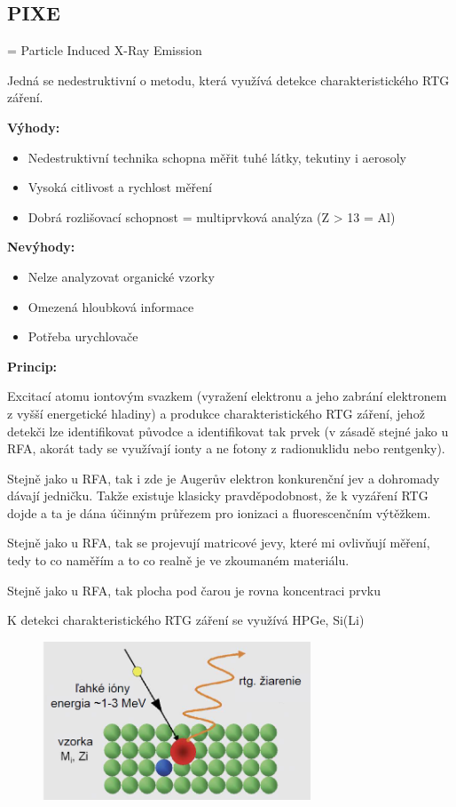\subsection{PIXE}

= Particle Induced X-Ray Emission

Jedná se nedestruktivní o metodu, která využívá detekce charakteristického RTG záření.

\textbf{Výhody:}

\begin{itemize}
    \item Nedestruktivní technika schopna měřit tuhé látky, tekutiny i aerosoly
    \item Vysoká citlivost a rychlost měření
    \item Dobrá rozlišovací schopnost = multiprvková analýza (Z > 13 = Al)
\end{itemize}

\textbf{Nevýhody:}

\begin{itemize}
    \item Nelze analyzovat organické vzorky
    \item Omezená hloubková informace
    \item Potřeba urychlovače
\end{itemize}

\textbf{Princip:}

Excitací atomu iontovým svazkem (vyražení elektronu a jeho zabrání elektronem z vyšší energetické hladiny) a produkce charakteristického RTG záření, jehož detekči lze identifikovat původce a identifikovat tak prvek (v zásadě stejné jako u RFA, akorát tady se využívají ionty a ne fotony z radionuklidu nebo rentgenky).

Stejně jako u RFA, tak i zde je Augerův elektron konkurenční jev a dohromady dávají jedničku. Takže existuje klasicky pravděpodobnost, že k vyzáření RTG dojde a ta je dána účinným průřezem pro ionizaci a fluorescenčním výtěžkem.

Stejně jako u RFA, tak se projevují matricové jevy, které mi ovlivňují měření, tedy to co naměřím a to co realně je ve zkoumaném materiálu.

Stejně jako u RFA, tak plocha pod čarou je rovna koncentraci prvku

K detekci charakteristického RTG záření se využívá HPGe, Si(Li)

\begin{figure}[H]
    \centering
	\includegraphics[width=8cm]{img/pixe.png}
\end{figure}

